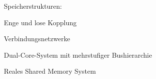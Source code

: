 \documentclass[10pt,landscape]{article}
\begin{document}
\begin{multicols}{3}
  
  Speicherstrukturen:
  
  Enge und lose Kopplung
  
  Verbindungsnetzwerke
  
  Dual-Core-System mit mehrstufiger Bushierarchie
  
  Reales Shared Memory System
  

\end{multicols}
\end{document}
